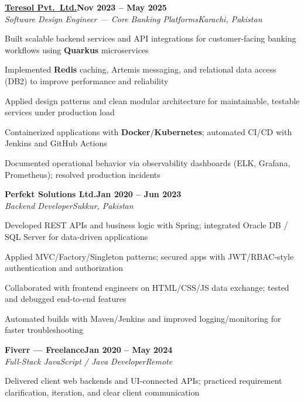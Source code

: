 \documentclass[letterpaper,10pt]{article}
\newcommand{\heading}[2]{
  \hspace{8pt}#1\hfill#2\\
}
\newcommand{\headingBf}[2]{
  \heading{\textbf{#1}}{\textbf{#2}}
}
\newcommand{\headingIt}[2]{
  \heading{\textit{#1}}{\textit{#2}}
}
\newenvironment{resume_list}{
  \vspace{-6pt}
  \begin{itemize}[itemsep=-1px, parsep=0.5pt, topsep=1pt, leftmargin=22pt]
}{
  \end{itemize}
  \vspace{-2pt}
}
\begin{document}
\vspace{2pt}
\headingBf{\href{https://teresol.com/}{Teresol Pvt.\ Ltd.}}{Nov 2023 -- May 2025}
\headingIt{Software Design Engineer --- Core Banking Platforms}{Karachi, Pakistan}
\begin{resume_list}
  \item Built scalable backend services and API integrations for customer-facing banking workflows using \textbf{Quarkus} microservices
  \item Implemented \textbf{Redis} caching, Artemis messaging, and relational data access (DB2) to improve performance and reliability
  \item Applied design patterns and clean modular architecture for maintainable, testable services under production load
  \item Containerized applications with \textbf{Docker}/\textbf{Kubernetes}; automated CI/CD with Jenkins and GitHub Actions
  \item Documented operational behavior via observability dashboards (ELK, Grafana, Prometheus); resolved production incidents
\end{resume_list}

\vspace{2pt}
\headingBf{Perfekt Solutions Ltd.}{Jan 2020 -- Jun 2023}
\headingIt{Backend Developer}{Sukkur, Pakistan}
\begin{resume_list}
  \item Developed REST APIs and business logic with Spring; integrated Oracle DB / SQL Server for data-driven applications
  \item Applied MVC/Factory/Singleton patterns; secured apps with JWT/RBAC-style authentication and authorization
  \item Collaborated with frontend engineers on HTML/CSS/JS data exchange; tested and debugged end-to-end features
  \item Automated builds with Maven/Jenkins and improved logging/monitoring for faster troubleshooting
\end{resume_list}

\vspace{2pt}
\headingBf{Fiverr --- Freelance}{Jan 2020 -- May 2024}
\headingIt{Full-Stack JavaScript / Java Developer}{Remote}
\begin{resume_list}
  \item Delivered client web backends and UI-connected APIs; practiced requirement clarification, iteration, and clear client communication
\end{resume_list}
\end{document}

